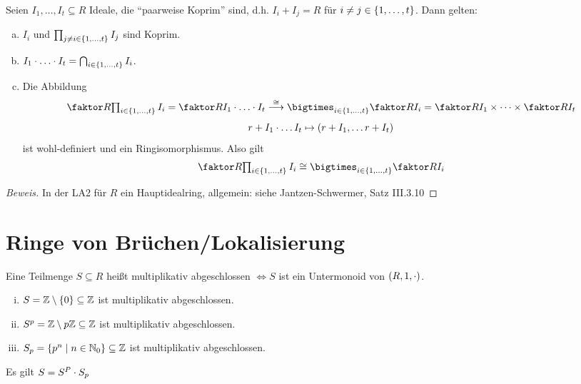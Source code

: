 \documentclass[a4paper]{report}
\begin{document}
\begin{satz}
  Seien $I_{1}, \ldots, I_{t} \subseteq R$ Ideale, die ``paarweise Koprim'' sind, d.h. $I_{i} + I_{j} = R$ für $i \ne j \in \{1, \ldots, t\}$. Dann gelten:
  \begin{enumerate}[(a)]
    \item $I_{i}$ und $\prod_{j \ne i \in \{1, \ldots, t\}}I_{j}$ sind Koprim.
    \item $I_{1}\cdot \ldots \cdot I_{t} = \bigcap_{i \in \{1, \ldots, t\}} I_{i}$.
    \item Die Abbildung
          \[\fak R{\textstyle \prod_{i \in \eb t}I_{i}} = \fak R{I_{1}\cd \ldots \cd I_{t}} \overset \cong \longrightarrow \bigtimes_{i \in \eb t} \fak R{I_{i}} = \fak R{I_{1}} \tm \cdots \tm \fak R{I_{t}}\]
          \[r+I_{1}\cdot \ldots I_{t} \mapsto (r+I_{1}, \ldots r+I_{t})\]
          ist wohl-definiert und ein Ringisomorphismus. Also gilt
          \[\fak R{\textstyle \prod_{i \in \eb t}I_{i}} \cong\bigtimes_{i \in \eb t} \fak R{I_{i}}\]
  \end{enumerate}

  \begin{proof}[Beweis]
    In der LA2 für $R$ ein Hauptidealring, allgemein: siehe Jantzen-Schwermer, Satz III.3.10
  \end{proof}
\end{satz}


\section{Ringe von Brüchen/Lokalisierung}%
\begin{defi}
Eine Teilmenge $S \subseteq R$ heißt multiplikativ abgeschlossen $\iff S$ ist ein Untermonoid von $(R, 1, \cdot)$.
\end{defi}
\begin{bsp*}
  \begin{enumerate}[(i)]
    \item $S = \mathbb{Z} \setminus \{0\} \subseteq \mathbb{Z}$ ist multiplikativ abgeschlossen.
    \item $S^{p} = \mathbb{Z} \setminus p \mathbb{Z} \subseteq \mathbb{Z}$ ist multiplikativ abgeschlossen.
    \item $S_{p} = \{p^{n} \mid n \in \mathbb{N}_0\} \subseteq \mathbb{Z}$ ist multiplikativ abgeschlossen.
  \end{enumerate}
  \item Es gilt $S = S^{P} \cdot S_{p}$
\end{bsp*}
\end{document}
